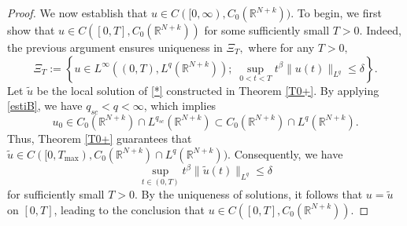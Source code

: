 \documentclass[a4,psfig,english,12pt,epsf,portrait]{article}
\numberwithin{equation}{section}
\begin{document}
\begin{proof}
	We now establish that $u\in C([0,\infty),C_0(\mathbb{R}^{N+k}))$. To begin, we first show that $u\in C([0,T],C_0(\mathbb{R}^{N+k}))$ for some sufficiently small $T>0$. Indeed, the previous argument ensures uniqueness in $\Xi_T,$ where for any $T>0,$
	$$
	\Xi_T:=\left\{u\in
	L^\infty((0,T),L^q(\mathbb{R}^{N+k}));\;\sup_{0<t<T}t^\beta\|u(t)\|_{L^q}\leq\delta\right\}.
	$$
	Let $\tilde{u}$ be the local solution of \eqref{*}
	constructed in Theorem \ref{T0+}. By applying \eqref{estiB}, we have $q_{sc}<q<\infty$, which implies 
	$$u_0\in C_0(\mathbb{R}^{N+k})\cap L^{q_{sc}}(\mathbb{R}^{N+k})\subset C_0(\mathbb{R}^{N+k})\cap L^{q}(\mathbb{R}^{N+k}).$$ 
	Thus,  Theorem \ref{T0+} guarantees that $\tilde{u}\in C([0,T_{\max}),C_0(\mathbb{R}^{N+k})\cap L^q(\mathbb{R}^{N+k}))$. Consequently, we have
	$$\sup\limits_{t\in(0,T)}t^\beta\|\tilde{u}(t)\|_{L^q}\leq\delta$$
	for sufficiently small  $T>0$. By the uniqueness of solutions, it follows that $u=\tilde{u}$ on
	$[0,T]$, leading to the conclusion that $u\in C([0,T],C_0(\mathbb{R}^{N+k}))$.
	

\end{proof}
\end{document}

